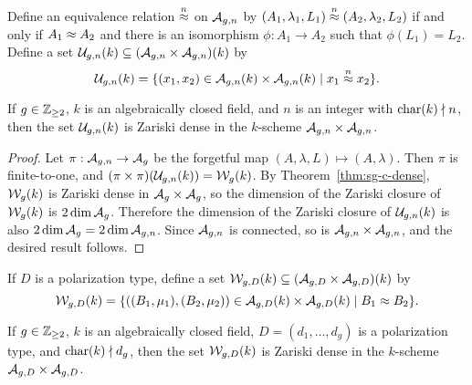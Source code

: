 \documentclass{amsart}
\begin{document}
 Define an equivalence relation $\stackrel{n}{\approx}$ on $\mathcal{A}_{g,n}$ by $(A_1, \lambda_1, L_1) \stackrel{n}{\approx} (A_2, \lambda_2, L_2)$ if and only if $A_1 \approx A_2$ and there is an isomorphism $\phi: A_1 \to A_2$ such that $\phi(L_1) = L_2$. %
 Define a set $\mathcal{U}_{g,n}(k)  \subseteq (\mathcal{A}_{g,n} \times \mathcal{A}_{g,n})(k)$ by
\[
\mg(k) =  \{(x_1,x_2) \in \agn(k) \times \agn(k) \mid x_1 \medium x_2 \}. %
\]
\begin{proposition}\label{prop:medium-isomorphic}
  If $g\in\mathbb{Z}_{\ge 2}$, %
  $k$ is an algebraically closed field, and $n$ is an integer with $\operatorname{char}(k) \nmid n$, %
  then the set $\mathcal{U}_{g,n}(k)$
  is Zariski dense in the $k$-scheme $\mathcal{A}_{g,n} \times \mathcal{A}_{g,n}$.
\end{proposition}

\begin{proof}
  Let $\pi: \mathcal{A}_{g,n} \to \mathcal{A}_g$ be the forgetful map $(A,\lambda,L) \mapsto (A,\lambda)$. Then $\pi$ is finite-to-one, and $(\pi\times\pi)(\mathcal{U}_{g,n}(k)) = \mathcal{W}_g(k)$. By Theorem~\ref{thm:sg-c-dense}, $\mathcal{W}_g(k)$ is Zariski dense in $\mathcal{A}_g \times \mathcal{A}_g$, so the dimension of the Zariski closure of $\mathcal{W}_g(k)$ is $2 \dim \mathcal{A}_g$. Therefore the dimension of the Zariski closure of $\mathcal{U}_{g,n}(k)$ is also $2 \dim \mathcal{A}_g = 2 \dim \mathcal{A}_{g,n}$. Since $\mathcal{A}_{g,n}$ is connected, so is $\mathcal{A}_{g,n} \times \mathcal{A}_{g,n}$, and the desired result follows.
\end{proof}

If $D$ is a polarization type, define a set $\mathcal{W}_{g,D}(k)  \subseteq (\mathcal{A}_{g,{D}} \times \mathcal{A}_{g,{D}})(k)$ by
\[
\mathcal{W}_{g,D}(k) =  \{((B_1,\mu_1), (B_2, \mu_2)) \in \mathcal{A}_{g,{D}}(k) \times \mathcal{A}_{g,{D}}(k) \mid B_1 \approx B_2 \}.
\]

\begin{proposition}
\label{prop:whatever}
  If $g\in\mathbb{Z}_{\ge 2}$, %
  $k$ is an algebraically closed field, $D=(d_1,\ldots,d_g)$ is a polarization type, and $\operatorname{char}(k) \nmid d_g$, %
  then the set $\mathcal{W}_{g,D}(k)$
is Zariski dense in the $k$-scheme $\mathcal{A}_{g,{D}} \times \mathcal{A}_{g,{D}}$.
\end{proposition}
\end{document}

